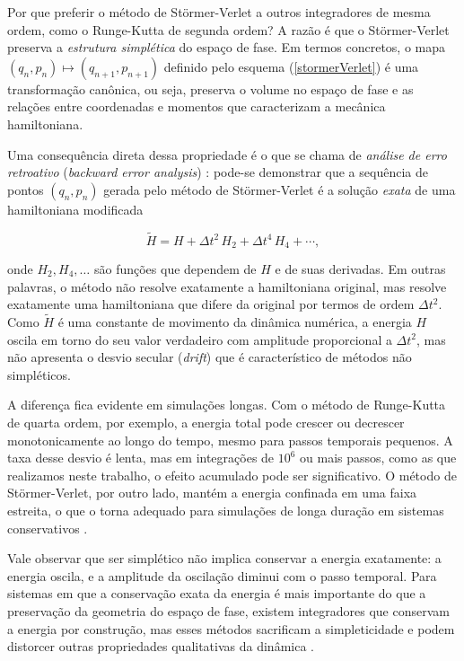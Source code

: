 \documentclass[twocolumn]{rbef}
\begin{document}
Por que preferir o método de Störmer-Verlet a outros integradores de mesma ordem, como o Runge-Kutta de segunda ordem? A razão é que o Störmer-Verlet preserva a \textit{estrutura simplética} do espaço de fase. Em termos concretos, o mapa $(q_n, p_n) \mapsto (q_{n+1}, p_{n+1})$ definido pelo esquema (\ref{stormerVerlet}) é uma transformação canônica, ou seja, preserva o volume no espaço de fase e as relações entre coordenadas e momentos que caracterizam a mecânica hamiltoniana.

Uma consequência direta dessa propriedade é o que se chama de \textit{análise de erro retroativo} (\textit{backward error analysis}) \cite{stormer-verlet, Hairer2003}: pode-se demonstrar que a sequência de pontos $(q_n, p_n)$ gerada pelo método de Störmer-Verlet é a solução \textit{exata} de uma hamiltoniana modificada

\begin{equation}\label{hamiltonianaModificada}
    \widetilde{H} = H + \Delta t^2 \, H_2 + \Delta t^4 \, H_4 + \cdots,
\end{equation}

\noindent onde $H_2, H_4, \ldots$ são funções que dependem de $H$ e de suas derivadas. Em outras palavras, o método não resolve exatamente a hamiltoniana original, mas resolve exatamente uma hamiltoniana que difere da original por termos de ordem $\Delta t^2$. Como $\widetilde{H}$ é uma constante de movimento da dinâmica numérica, a energia $H$ oscila em torno do seu valor verdadeiro com amplitude proporcional a $\Delta t^2$, mas não apresenta o desvio secular (\textit{drift}) que é característico de métodos não simpléticos.

A diferença fica evidente em simulações longas. Com o método de Runge-Kutta de quarta ordem, por exemplo, a energia total pode crescer ou decrescer monotonicamente ao longo do tempo, mesmo para passos temporais pequenos. A taxa desse desvio é lenta, mas em integrações de $10^6$ ou mais passos, como as que realizamos neste trabalho, o efeito acumulado pode ser significativo. O método de Störmer-Verlet, por outro lado, mantém a energia confinada em uma faixa estreita, o que o torna adequado para simulações de longa duração em sistemas conservativos \cite{stormer-verlet}.

Vale observar que ser simplético não implica conservar a energia exatamente: a energia oscila, e a amplitude da oscilação diminui com o passo temporal. Para sistemas em que a conservação exata da energia é mais importante do que a preservação da geometria do espaço de fase, existem integradores que conservam a energia por construção, mas esses métodos sacrificam a simpleticidade e podem distorcer outras propriedades qualitativas da dinâmica \cite{stormer-verlet}.
\end{document}
